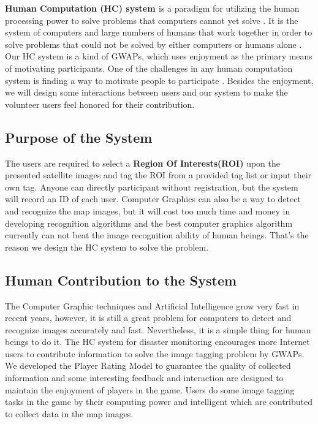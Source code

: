 \textbf{Human Computation (HC) system \label{idx:hc}} is a paradigm for utilizing the human processing power to solve problems that 
computers cannot yet solve \cite{quinn2011human}. 
It is the system of computers and large numbers of humans that work together in order to solve problems that 
could not be solved by either computers or humans alone \cite{quinn2009taxonomy}.
Our HC system is a kind of GWAPs, which uses enjoyment as the primary means of motivating participants. 
One of the challenges in any human computation system is finding a way to motivate people 
to participate \cite{quinn2011human}. 
Besides the enjoyment, we will design some interactions between users and our system to 
make the volunteer users feel honored for their contribution.

\subsection{Purpose of the System}
The users are required to select a \textbf{Region Of Interests(ROI)} upon the presented satellite images 
and tag the ROI from a provided tag list or input their own tag. Anyone can directly participant 
without registration, but the system will record an ID of each user.
Computer Graphics can also be a way to detect and recognize the map images, but it will cost 
too much time and money in developing recognition algorithms and the best 
computer graphics algorithm currently can not beat the image recognition ability of human beings. 
That's the reason we design the HC system to solve the problem.

\subsection{Human Contribution to the System}
The Computer Graphic techniques and Artificial Intelligence grow very fast in recent years, 
however, it is still a great problem for computers to detect and recognize images accurately and fast.
Nevertheless, it is a simple thing for human beings to do it.
The HC system for disaster monitoring encourages more Internet users to contribute information 
to solve the image tagging problem by GWAPs. 
We developed the Player Rating Model to guarantee the quality of collected information 
and some interesting feedback and interaction are designed to maintain the enjoyment of players in the game.
Users do some image tagging tasks in the game by their computing power and intelligent 
which are contributed to collect data in the map images.

